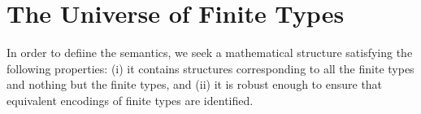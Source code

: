 \section{The Universe of Finite Types}
\label{sec:ufin}

In order to defiine the semantics, we seek a mathematical structure satisfying the following properties: (i) it contains structures corresponding to all the finite types and nothing but the finite types, and (ii) it is robust enough to ensure that equivalent encodings of finite types are identified. 


